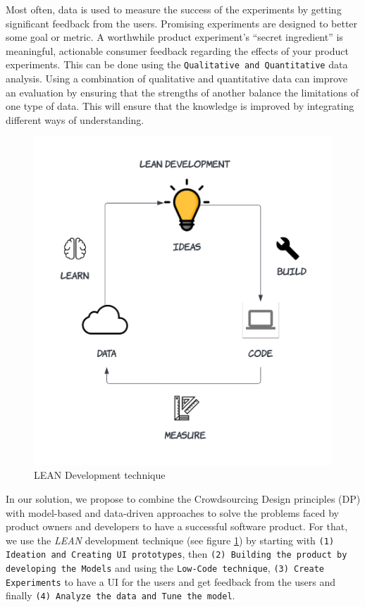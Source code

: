 Most often, data is used to measure the success of the experiments by getting significant feedback from the users.
Promising experiments are designed to better some goal or metric. 
A worthwhile product experiment's ``secret ingredient'' is meaningful, actionable consumer feedback regarding the effects of your product experiments.
This can be done using the \texttt{Qualitative and Quantitative} data analysis.
Using a combination of qualitative and quantitative data can improve an evaluation by ensuring that the strengths of another balance the limitations of one type of data.
This will ensure that the knowledge is improved by integrating different ways of understanding.
\begin{figure}[ht]
    \centering
    \includegraphics[scale=0.22]{images/solution-ideas/LEAN.png}
    \caption{LEAN Development technique}
    \label{intro:fig:lean}
\end{figure}
\par
In our solution, we propose to combine the Crowdsourcing Design principles (DP) \cite{misc:crowdsourcing:sg} with model-based and data-driven approaches to solve the problems faced by product owners and developers to have a successful software product.
For that, we use the \emph{LEAN} development technique (see figure \ref{intro:fig:lean}) by starting with \texttt{(1) Ideation and Creating UI prototypes}, then \texttt{(2) Building the product by developing the Models} and using the \texttt{Low-Code technique}, \texttt{(3) Create Experiments} to have a UI for the users and get feedback from the users and finally \texttt{(4) Analyze the data and Tune the model}.